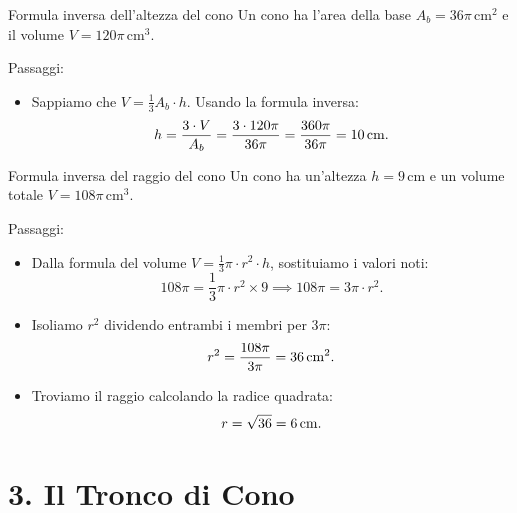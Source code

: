\condnewpage

\begin{esercizio}{Formula inversa dell'altezza del cono}
Un cono ha l'area della base $A_b = 36\pi\,\mathrm{cm^2}$ e il volume $V = 120\pi\,\mathrm{cm^3}$.


\responsespace{5.5cm}

\begin{soluzione}
  Passaggi:
  \begin{itemize}
    \item Sappiamo che $V = \frac{1}{3} A_b \cdot h$. Usando la formula inversa:
    \[
    h = \frac{3 \cdot V}{A_b} = \frac{3 \cdot 120\pi}{36\pi} = \frac{360\pi}{36\pi} = 10\,\mathrm{cm}.
    \]
  \end{itemize}
\end{soluzione}
\end{esercizio}

\condnewpage

\begin{esercizio}{Formula inversa del raggio del cono}
Un cono ha un'altezza $h = 9\,\mathrm{cm}$ e un volume totale $V = 108\pi\,\mathrm{cm^3}$.


\responsespace{5.5cm}

\begin{soluzione}
  Passaggi:
  \begin{itemize}
    \item Dalla formula del volume $V = \frac{1}{3} \pi \cdot r^2 \cdot h$, sostituiamo i valori noti:
    \[
    108\pi = \frac{1}{3} \pi \cdot r^2 \times 9 \implies 108\pi = 3\pi \cdot r^2.
    \]
    \item Isoliamo $r^2$ dividendo entrambi i membri per $3\pi$:
    \[
    r^2 = \frac{108\pi}{3\pi} = 36\,\mathrm{cm^2}.
    \]
    \item Troviamo il raggio calcolando la radice quadrata:
    \[
    r = \sqrt{36} = 6\,\mathrm{cm}.
    \]
  \end{itemize}
\end{soluzione}
\end{esercizio}

\condnewpage

\section*{3. Il Tronco di Cono}

